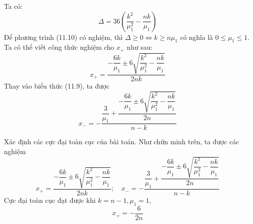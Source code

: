 \begin{solution}
        Ta có:
        \begin{equation}
            \Delta = 36\left(\dfrac{k^2}{\mu_1^2}-\dfrac{nk}{\mu_1}\right)
        \end{equation}
        Để phương trình (11.10) có nghiệm, thì $\Delta \geq 0 \Leftrightarrow k \geq n\mu_1$ có nghĩa là $0\leq \mu_1 \leq 1$. Ta có thể viết công thức nghiệm cho $x_{+}$ như sau:
        \begin{equation}
            x_{+} = \dfrac{-\dfrac{6k}{\mu_1}\pm 6\sqrt{\dfrac{k^2}{\mu_1^2}-\dfrac{nk}{\mu_1}}}{2nk}
        \end{equation}
        Thay vào biểu thức (11.9), ta được
        \begin{equation}
            x_{-} = -\dfrac{\dfrac{3}{\mu_1} + \dfrac{-\dfrac{6k}{\mu_1}\pm 6\sqrt{\dfrac{k^2}{\mu_1^2}-\dfrac{nk}{\mu_1}}}{2n}}{n-k}
        \end{equation}
        \item Xác định các cực đại toàn cục của bài toán. Như chứn minh trên, ta được các nghiệm
        \begin{equation}
            x_{+} = \dfrac{-\dfrac{6k}{\mu_1}\pm 6\sqrt{\dfrac{k^2}{\mu_1^2}-\dfrac{nk}{\mu_1}}}{2nk};\quad x_{-} = -\dfrac{\dfrac{3}{\mu_1} + \dfrac{-\dfrac{6k}{\mu_1}\pm 6\sqrt{\dfrac{k^2}{\mu_1^2}-\dfrac{nk}{\mu_1}}}{2n}}{n-k}
        \end{equation}
        Cực đại toàn cục đạt được khi $k=n-1, \mu_1 = 1$, 
        \begin{equation}
            x_{+} = -\dfrac{6}{2n}
        \end{equation}
\end{solution}